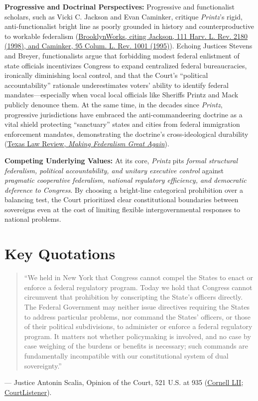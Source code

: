 \documentclass[12pt]{article}
\begin{document}
\textbf{Progressive and Doctrinal Perspectives:} Progressive and functionalist scholars, such as Vicki C. Jackson and Evan Caminker, critique \textit{Printz}'s rigid, anti-functionalist bright line as poorly grounded in history and counterproductive to workable federalism (\href{https://brooklynworks.brooklaw.edu/context/faculty/article/2006/viewcontent/Gold22.pdf}{BrooklynWorks, citing Jackson, 111 Harv. L. Rev. 2180 (1998), and Caminker, 95 Colum. L. Rev. 1001 (1995)}). Echoing Justices Stevens and Breyer, functionalists argue that forbidding modest federal enlistment of state officials incentivizes Congress to expand centralized federal bureaucracies, ironically diminishing local control, and that the Court's ``political accountability'' rationale underestimates voters' ability to identify federal mandates---especially when vocal local officials like Sheriffs Printz and Mack publicly denounce them. At the same time, in the decades since \textit{Printz}, progressive jurisdictions have embraced the anti-commandeering doctrine as a vital shield protecting ``sanctuary'' states and cities from federal immigration enforcement mandates, demonstrating the doctrine's cross-ideological durability (\href{https://texaslawreview.org/making-federalism-great-again/}{Texas Law Review, \textit{Making Federalism Great Again}}).

\textbf{Competing Underlying Values:} At its core, \textit{Printz} pits \textit{formal structural federalism, political accountability, and unitary executive control} against \textit{pragmatic cooperative federalism, national regulatory efficiency, and democratic deference to Congress}. By choosing a bright-line categorical prohibition over a balancing test, the Court prioritized clear constitutional boundaries between sovereigns even at the cost of limiting flexible intergovernmental responses to national problems.

\section{Key Quotations}

\begin{quote}
``We held in New York that Congress cannot compel the States to enact or enforce a federal regulatory program. Today we hold that Congress cannot circumvent that prohibition by conscripting the State's officers directly. The Federal Government may neither issue directives requiring the States to address particular problems, nor command the States' officers, or those of their political subdivisions, to administer or enforce a federal regulatory program. It matters not whether policymaking is involved, and no case by case weighing of the burdens or benefits is necessary; such commands are fundamentally incompatible with our constitutional system of dual sovereignty.''
\end{quote}
\noindent --- Justice Antonin Scalia, Opinion of the Court, 521 U.S. at 935 (\href{https://www.law.cornell.edu/supct/html/95-1478.ZO.html}{Cornell LII}; \href{https://www.courtlistener.com/opinion/118148/printz-v-united-states/}{CourtListener}).
\end{document}
